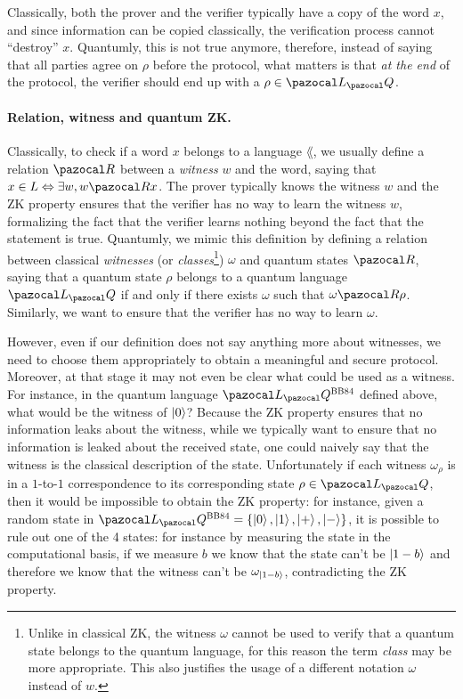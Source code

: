 Classically, both the prover and the verifier typically have a copy of the word $x$, and since information can be copied classically, the verification process cannot ``destroy'' $x$. Quantumly, this is not true anymore, therefore, instead of saying that all parties agree on $\rho$ before the protocol, what matters is that \emph{at the end} of the protocol, the verifier should end up with a $\rho \in \lang_\cQ$.

\paragraph{Relation, witness and quantum ZK.}

Classically, to check if a word $x$ belongs to a language $\lang$, we usually define a relation $\cR$ between a \emph{witness} $w$ and the word, saying that $x \in L \Leftrightarrow \exists w, w \cR x$. The prover typically knows the witness $w$ and the ZK property ensures that the verifier has no way to learn the witness $w$, formalizing the fact that the verifier learns nothing beyond the fact that the statement is true. Quantumly, we mimic this definition by defining a relation between classical \emph{witnesses} (or \emph{classes}\footnote{Unlike in classical ZK, the witness $\omega$ cannot be used to verify that a quantum state belongs to the quantum language, for this reason the term \emph{class} may be more appropriate. This also justifies the usage of a different notation $\omega$ instead of $w$.}) $\omega$ and quantum states $\cR$, saying that a quantum state $\rho$ belongs to a quantum language $\lang_\cQ$ if and only if there exists $\omega$ such that $\omega \cR \rho$. Similarly, we want to ensure that the verifier has no way to learn $\omega$.

However, even if our definition does not say anything more about witnesses, we need to choose them appropriately to obtain a meaningful and secure protocol. Moreover, at that stage it may not even be clear what could be used as a witness. For instance, in the quantum language $\lang_\cQ^{\BBHeightyFor{}}$ defined above, what would be the witness of $\ket{0}$? Because the ZK property ensures that no information leaks about the witness, while we typically want to ensure that no information is leaked about the received state, one could naively say that the witness is the classical description of the state. Unfortunately if each witness $\omega_\rho$ is in a $1$-to-$1$ correspondence to its corresponding state $\rho \in \lang_\cQ$, then it would be impossible to obtain the ZK property: for instance, given a random state in $\lang_\cQ^{\BBHeightyFor{}} = \{\ket{0}, \ket{1}, \ket{+}, \ket{-}\}$, it is possible to rule out one of the 4 states: for instance by measuring the state in the computational basis, if we measure $b$ we know that the state can't be $\ket{1-b}$ and therefore we know that the witness can't be $\omega_{\ket{1-b}}$, contradicting the ZK property.

